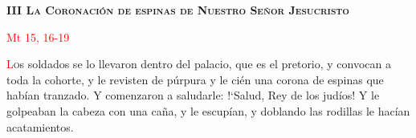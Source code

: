 \begin{center}
    \textbf{\textsc{III La Coronación de espinas de Nuestro Señor Jesucristo}}

    \textcolor{red}{Mt 15, 16-19}
\end{center}

\lettrine[lines=2]{\textcolor{red}{L}}os soldados se lo llevaron dentro del palacio, que es el pretorio, y convocan a toda la cohorte, y le revisten
de púrpura y le cién una corona de espinas que habían tranzado. Y comenzaron a saludarle: {!`}Salud, Rey de los judíos! Y le golpeaban la cabeza con
una caña, y le escupían, y doblando las rodillas le hacían acatamientos.